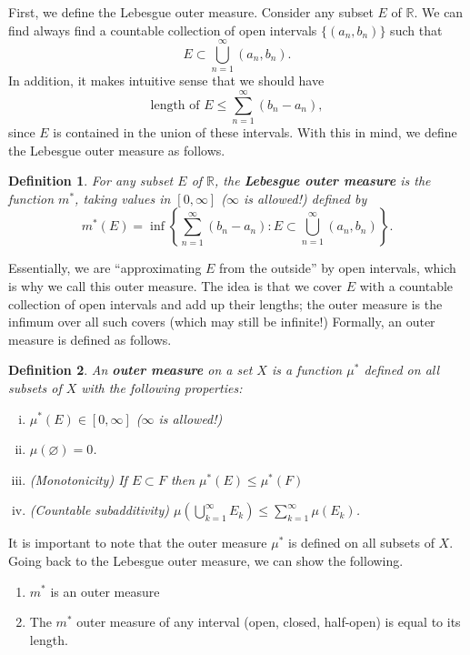 \documentclass[12pt]{amsart}         %
\newtheorem{definition}{Definition}[section]
\theoremstyle{remark}
\newcommand{\R}{\mathbb{R}}
\begin{document}
First, we define the Lebesgue outer measure. Consider any subset $E$ of $\R$. We can find always find a countable collection of open intervals $\{ (a_n, b_n) \}$ such that 
\[
E \subset \bigcup_{n=1}^\infty (a_n, b_n).
\]
In addition, it makes intuitive sense that we should have
\[
\text{length of }E \leq \sum_{n = 1}^\infty (b_n - a_n),
\]
since $E$ is contained in the union of these intervals. With this in mind, we define the Lebesgue outer measure as follows.

\begin{definition}
For any subset $E$ of $\R$, the \textbf{Lebesgue outer measure} is the function $m^*$, taking values in $[0, \infty]$ ($\infty$ is allowed!) defined by
\[
m^*(E) = \inf\left\{ \sum_{n = 1}^\infty (b_n - a_n) : E \subset \bigcup_{n=1}^\infty (a_n, b_n) \right\}.
\]
\end{definition}
Essentially, we are ``approximating $E$ from the outside'' by open intervals, which is why we call this outer measure. The idea is that we cover $E$ with a countable collection of open intervals and add up their lengths; the outer measure is the infimum over all such covers (which may still be infinite!) Formally, an outer measure is defined as follows.

\begin{definition}An \textbf{outer measure} on a set $X$ is a function $\mu^*$ defined on \emph{all} subsets of $X$ with the following properties:
\begin{enumerate}[(i)]
\item $\mu^*(E) \in [0, \infty]$ ($\infty$ is allowed!)
\item $\mu(\varnothing) = 0$.
\item (Monotonicity) If $E \subset F$ then $\mu^*(E) \leq \mu^*(F)$
\item (Countable subadditivity)
	$ \mu \left( \bigcup_{k=1}^\infty E_k \right) \leq \sum_{k=1}^\infty \mu(E_k)$.
\end{enumerate}
\end{definition}
It is important to note that the outer measure $\mu^*$ is defined on all subsets of $X$. Going back to the Lebesgue outer measure, we can show the following.
\begin{enumerate}
    \item $m^*$ is an outer measure
    \item The $m^*$ outer measure of any interval (open, closed, half-open) is equal to its length.
\end{enumerate}
\end{document}
